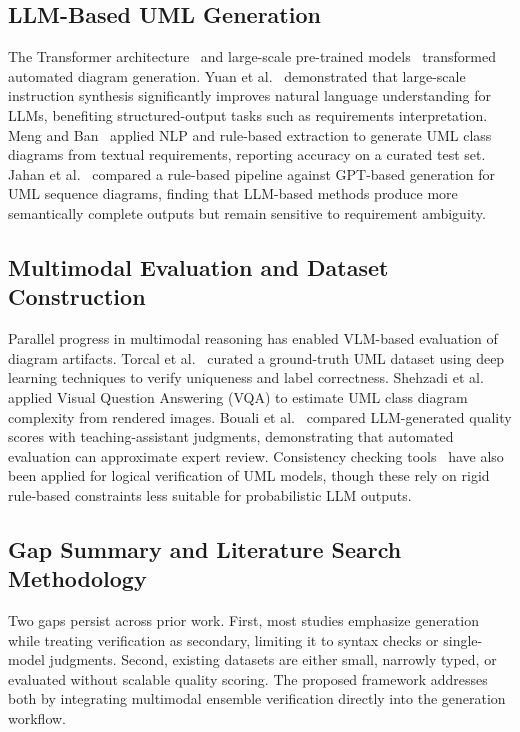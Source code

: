 \documentclass[conference]{IEEEtran}
\begin{document}
\subsection{LLM-Based UML Generation}

The Transformer architecture~\cite{vaswani2017} and large-scale
pre-trained models~\cite{brown2020} transformed automated diagram
generation. Yuan et al.~\cite{yuan2025} demonstrated that large-scale
instruction synthesis significantly improves natural language
understanding for LLMs, benefiting structured-output tasks such as
requirements interpretation. Meng and Ban~\cite{meng2024} applied NLP
and rule-based extraction to generate UML class diagrams from textual
requirements, reporting accuracy on a curated test set. Jahan et
al.~\cite{jahan2024} compared a rule-based pipeline against GPT-based
generation for UML sequence diagrams, finding that LLM-based methods
produce more semantically complete outputs but remain sensitive to
requirement ambiguity.

\subsection{Multimodal Evaluation and Dataset Construction}

Parallel progress in multimodal reasoning has enabled VLM-based
evaluation of diagram artifacts. Torcal et al.~\cite{torcal2024}
curated a ground-truth UML dataset using deep learning techniques to
verify uniqueness and label correctness. Shehzadi et
al.~\cite{shehzadi2025} applied Visual Question Answering (VQA) to
estimate UML class diagram complexity from rendered images. Bouali et
al.~\cite{bouali2025} compared LLM-generated quality scores with
teaching-assistant judgments, demonstrating that automated evaluation
can approximate expert review. Consistency checking tools~\cite{simmonds2005}
have also been applied for logical verification of UML models, though
these rely on rigid rule-based constraints less suitable for probabilistic
LLM outputs.

\subsection{Gap Summary and Literature Search Methodology}

Two gaps persist across prior work. First, most studies emphasize
generation while treating verification as secondary, limiting it to
syntax checks or single-model judgments. Second, existing datasets are
either small, narrowly typed, or evaluated without scalable quality
scoring. The proposed framework addresses both by integrating multimodal
ensemble verification directly into the generation workflow.
\end{document}
